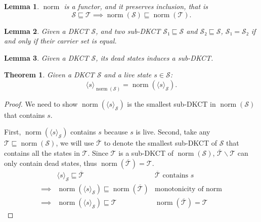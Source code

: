 \documentclass[acmsmall,screen]{acmart}
\newtheorem{theorem}{Theorem}
\newtheorem{lemma}{Lemma}
\DeclareMathOperator{\norm}{\mathrm{norm}}
\begin{document}
\begin{lemma}
    \(\norm\) is a functor, and it preserves inclusion, that is 
    \[𝒮 ⊑ 𝒯 ⟹ \norm(𝒮) ⊑ \norm(𝒯).\]
\end{lemma}

\begin{lemma}
    Given a DKCT \(𝒮\), and two sub-DKCT \(𝒮₁ ⊑ 𝒮\) and \(𝒮₂ ⊑ 𝒮\), \(𝒮₁ = 𝒮₂\) if and only if their carrier set is equal.
\end{lemma}

\begin{lemma}
    Given a DKCT \(𝒮\), its dead states induces a sub-DKCT.
\end{lemma}

\begin{theorem}
    Given a DKCT \(𝒮\) and a live state \(s ∈ 𝒮\):
    \[⟨s⟩_{\norm(𝒮)} = \norm(⟨s⟩_{𝒮}).\]
\end{theorem}

\begin{proof}
    We need to show \(\norm(⟨s⟩_{𝒮})\) is the smallest sub-DKCT in \(\norm(𝒮)\) that contains \(s\). 
    
    First, \(\norm(⟨s⟩_{𝒮})\) contains \(s\) because \(s\) is live. 
    Second, take any \(𝒯 ⊑ \norm(𝒮)\), we will use \(\overline{𝒯}\) to denote the smallest sub-DKCT of \(𝒮\) that contains all the states in \(𝒯\). 
    Since \(𝒯\) is a sub-DKCT of \(\norm(𝒮)\), \(\overline{𝒯} ∖ 𝒯\) can only contain dead states, thus \(\norm(\overline{𝒯}) = 𝒯\).
    \begin{align*}
        & ⟨s⟩_{𝒮} ⊑ \overline{𝒯} & \text{\(\overline{𝒯}\) contains \(s\)} \\  
        ⟹ {}& \norm(⟨s⟩_{𝒮}) ⊑ \norm(\overline{𝒯}) & \text{monotonicity of \(\norm\)} \\  
        ⟹ {}& \norm(⟨s⟩_{𝒮}) ⊑ 𝒯 & \norm(\overline{𝒯}) = 𝒯
    \end{align*}
\end{proof}
\end{document}
